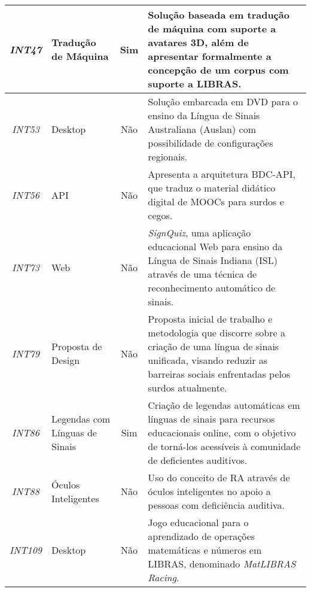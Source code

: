 \begin{small}
\begin{longtable}{|c|C{2.75cm}|c|L{10cm}|}
\textit{INT47} & Tradução de Máquina & Sim & Solução baseada em tradução de máquina com suporte a avatares 3D, além de apresentar formalmente a concepção de um corpus com suporte a LIBRAS. \\ \hline
\textit{INT53} & Desktop & Não & Solução embarcada em DVD para o ensino da Língua de Sinais Australiana (Auslan) com possibilidade de configurações regionais. \\ \hline
\textit{INT56} & API & Não & Apresenta a arquitetura BDC-API, que traduz o material didático digital de MOOCs para surdos e cegos. \\ \hline
\textit{INT73} & Web & Não & \textit{SignQuiz}, uma aplicação educacional Web para ensino da Língua de Sinais Indiana (ISL) através de uma técnica de reconhecimento automático de sinais. \\ \hline
\textit{INT79} & Proposta de Design & Não & Proposta inicial de trabalho e metodologia que discorre sobre a criação de uma língua de sinais unificada, visando reduzir as barreiras sociais enfrentadas pelos surdos atualmente. \\ \hline
\textit{INT86} & Legendas com Línguas de Sinais & Sim & Criação de legendas automáticas em línguas de sinais para recursos educacionais online, com o objetivo de torná-los acessíveis à comunidade de deficientes auditivos. \\ \hline
\textit{INT88} & Óculos Inteligentes & Não & Uso do conceito de RA através de óculos inteligentes no apoio a pessoas com deficiência auditiva. \\ \hline
\textit{INT109} & Desktop & Não & Jogo educacional para o aprendizado de operações matemáticas e números em LIBRAS, denominado \textit{MatLIBRAS Racing}. \\ \hline
\end{longtable}
\end{small}

